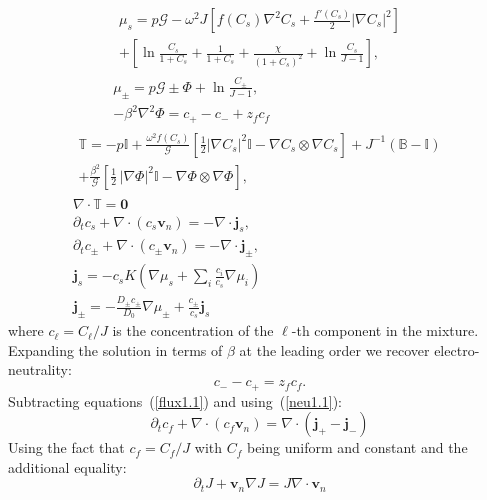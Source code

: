 \documentclass[12pt]{extarticle}
\begin{document}
\begin{gather}
\begin{aligned}
\mu_s = p \mathcal{G} - \omega^2 J \left[f(C_s)\nabla^2 C_s+\frac{f'(C_s)}{2}\left|\nabla C_s\right|^2\right]\\
 + \left[\ln \frac{C_s}{1+C_s} + \frac{1}{1+C_s}
 +\frac{\chi}{(1+C_s)^2} + \ln \frac{C_s}{J-1} \right], 
\end{aligned}\\[2.5mm]
\mu_\pm = p \mathcal{G} \pm \Phi + \ln \frac{C_\pm}{J-1} ,\\
-\beta^2 \nabla^2 \Phi = c_+-c_-+z_fc_f\, 
\end{gather}
\begin{gather}
\begin{aligned}
\mathbb{T}= -p \mathbb{I} +\frac{\omega^2f(C_s) }{\mathcal{G}} \left[\frac{1}{2} |\nabla C_s|^2\mathbb{I} - \nabla C_s \otimes \nabla C_s\right]+ J^{-1}\left(\mathbb{B}-\mathbb{I}\right)\\
+ \frac{\beta^2}{\mathcal{G}} \left[\frac{1}{2} \,|\nabla \Phi|^2\mathbb{I} -\nabla \Phi \otimes \nabla \Phi\right],
\end{aligned}\\
\nabla \cdot \mathbb{T}=\mathbf{0}\\
\partial_t c_s + \nabla \cdot(c_s \mathbf{v}_n)=- \nabla \cdot\mathbf{j}_s,\\
\partial_t c_\pm + \nabla \cdot(c_\pm \mathbf{v}_n)= -\nabla\cdot\mathbf{j}_\pm,\label{flux1.1}\\
\mathbf{j}_s =-c_sK  \left(\nabla \mu_s +\sum_i \frac{c_i}{c_s} \nabla \mu_i\right)\\
\mathbf{j}_\pm= - \frac{D_\pm c_\pm}{D_0}\nabla \mu_\pm + \frac{c_\pm}{c_s}\mathbf{j}_s
\end{gather}
where $c_\ell=C_\ell/J$ is the concentration of the $\ell$-th component in the mixture.
Expanding the solution in terms of $\beta$ at the leading order we recover electro-neutrality:
\begin{equation}
c_- - c_+=z_f c_f. \label{neu1.1}
\end{equation}
Subtracting equations~(\ref{flux1.1}) and using~(\ref{neu1.1}):
\begin{equation}
\partial_t c_f +\nabla \cdot(c_f \mathbf{v}_n)= \nabla\cdot(\mathbf{j}_+-\mathbf{j}_-)
\end{equation}
Using the fact that $c_f=C_f/J$ with $C_f$ being uniform and constant and the additional equality:
\begin{equation}
\partial_t J + \mathbf{v}_n \nabla J=J\nabla \cdot\mathbf{v}_n
\end{equation}
\end{document}
